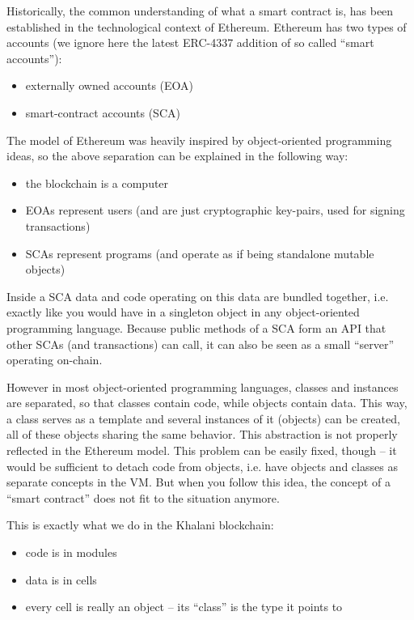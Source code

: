 \documentclass[a4paper]{article}
\begin{document}
Historically, the common understanding of what a smart contract is, has been established in the technological context of Ethereum. Ethereum has two types of accounts (we ignore here the latest ERC-4337 addition of so called ``smart accounts''):

\begin{itemize}
  \item externally owned accounts (EOA)
  \item smart-contract accounts (SCA)
\end{itemize}

The model of Ethereum was heavily inspired by object-oriented programming ideas, so the above separation can be explained in the following way:

\begin{itemize}
  \item the blockchain is a computer
  \item EOAs represent users (and are just cryptographic key-pairs, used for signing transactions)
  \item SCAs represent programs (and operate as if being standalone mutable objects)
\end{itemize}

Inside a SCA data and code operating on this data are bundled together, i.e. exactly like you would have in a singleton object in any object-oriented programming language. Because public methods of a SCA form an API that other SCAs (and transactions) can call, it can also be seen as a small ``server'' operating on-chain.

However in most object-oriented programming languages, classes and instances are separated, so that classes contain code, while objects contain data. This way, a class serves as a template and several instances of it (objects) can be created, all of these objects sharing the same behavior. This abstraction is not properly reflected in the Ethereum model. This problem can be easily fixed, though -- it would be sufficient to detach code from objects, i.e. have objects and classes as separate concepts in the VM. But when you follow this idea, the concept of a ``smart contract'' does not fit to the situation anymore.

This is exactly what we do in the Khalani blockchain:

\begin{itemize}
  \item code is in modules
  \item data is in cells
  \item every cell is really an object -- its ``class'' is the type it points to
\end{itemize}
\end{document}

